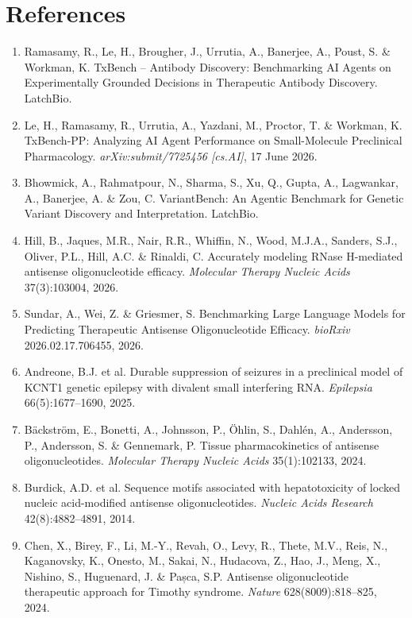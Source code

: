 \documentclass[11pt]{article}
\begin{document}
\section*{References}
\begin{enumerate}[leftmargin=2em,itemsep=3pt]
\item Ramasamy, R., Le, H., Brougher, J., Urrutia, A., Banerjee, A., Poust, S. \& Workman, K. TxBench -- Antibody Discovery: Benchmarking AI Agents on Experimentally Grounded Decisions in Therapeutic Antibody Discovery. LatchBio.
\item Le, H., Ramasamy, R., Urrutia, A., Yazdani, M., Proctor, T. \& Workman, K. TxBench-PP: Analyzing AI Agent Performance on Small-Molecule Preclinical Pharmacology. \textit{arXiv:submit/7725456 [cs.AI]}, 17 June 2026.
\item Bhowmick, A., Rahmatpour, N., Sharma, S., Xu, Q., Gupta, A., Lagwankar, A., Banerjee, A. \& Zou, C. VariantBench: An Agentic Benchmark for Genetic Variant Discovery and Interpretation. LatchBio.
\item Hill, B., Jaques, M.R., Nair, R.R., Whiffin, N., Wood, M.J.A., Sanders, S.J., Oliver, P.L., Hill, A.C. \& Rinaldi, C. Accurately modeling RNase H-mediated antisense oligonucleotide efficacy. \textit{Molecular Therapy Nucleic Acids} 37(3):103004, 2026.
\item Sundar, A., Wei, Z. \& Griesmer, S. Benchmarking Large Language Models for Predicting Therapeutic Antisense Oligonucleotide Efficacy. \textit{bioRxiv} 2026.02.17.706455, 2026.
\item Andreone, B.J. et al. Durable suppression of seizures in a preclinical model of KCNT1 genetic epilepsy with divalent small interfering RNA. \textit{Epilepsia} 66(5):1677--1690, 2025.
\item Bäckström, E., Bonetti, A., Johnsson, P., Öhlin, S., Dahlén, A., Andersson, P., Andersson, S. \& Gennemark, P. Tissue pharmacokinetics of antisense oligonucleotides. \textit{Molecular Therapy Nucleic Acids} 35(1):102133, 2024.
\item Burdick, A.D. et al. Sequence motifs associated with hepatotoxicity of locked nucleic acid-modified antisense oligonucleotides. \textit{Nucleic Acids Research} 42(8):4882--4891, 2014.
\item Chen, X., Birey, F., Li, M.-Y., Revah, O., Levy, R., Thete, M.V., Reis, N., Kaganovsky, K., Onesto, M., Sakai, N., Hudacova, Z., Hao, J., Meng, X., Nishino, S., Huguenard, J. \& Pașca, S.P. Antisense oligonucleotide therapeutic approach for Timothy syndrome. \textit{Nature} 628(8009):818--825, 2024.

\end{enumerate}
\end{document}
